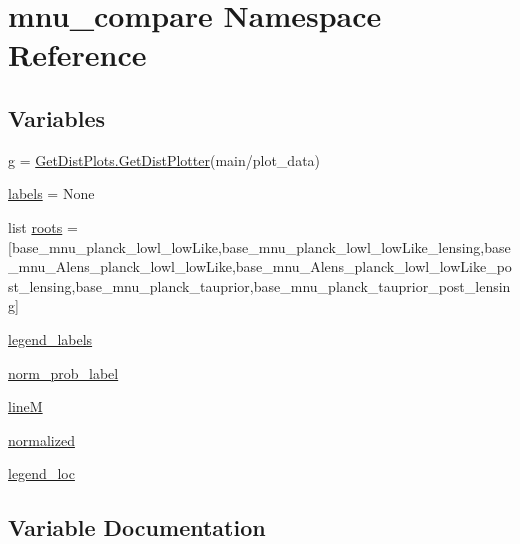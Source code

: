 \hypertarget{namespacemnu__compare}{}\section{mnu\+\_\+compare Namespace Reference}
\label{namespacemnu__compare}
\subsection*{Variables}
\begin{DoxyCompactItemize}
\item 
\mbox{\hyperlink{namespacemnu__compare_a0b3ebfeeadc47562ae3d9cd014ec1cd5}{g}} = \mbox{\hyperlink{classgetdist_1_1plots_1_1GetDistPlotter}{Get\+Dist\+Plots.\+Get\+Dist\+Plotter}}(\textquotesingle{}main/plot\+\_\+data\textquotesingle{})
\item 
\mbox{\hyperlink{namespacemnu__compare_aa5ff661bdf482297da0f229b27bb44cf}{labels}} = None
\item 
list \mbox{\hyperlink{namespacemnu__compare_a44369ac9173dc3327784e1ae5393d49a}{roots}} = \mbox{[}\textquotesingle{}base\+\_\+mnu\+\_\+planck\+\_\+lowl\+\_\+low\+Like\textquotesingle{},\textquotesingle{}base\+\_\+mnu\+\_\+planck\+\_\+lowl\+\_\+low\+Like\+\_\+lensing\textquotesingle{},\textquotesingle{}base\+\_\+mnu\+\_\+\+Alens\+\_\+planck\+\_\+lowl\+\_\+low\+Like\textquotesingle{},\textquotesingle{}base\+\_\+mnu\+\_\+\+Alens\+\_\+planck\+\_\+lowl\+\_\+low\+Like\+\_\+post\+\_\+lensing\textquotesingle{},\textquotesingle{}base\+\_\+mnu\+\_\+planck\+\_\+tauprior\textquotesingle{},\textquotesingle{}base\+\_\+mnu\+\_\+planck\+\_\+tauprior\+\_\+post\+\_\+lensing\textquotesingle{}\mbox{]}
\item 
\mbox{\hyperlink{namespacemnu__compare_ad1d0329e168c4e8abcbf4fd341a190b7}{legend\+\_\+labels}}
\item 
\mbox{\hyperlink{namespacemnu__compare_ad1f46a08ce79ca199af24a7fc0bb295c}{norm\+\_\+prob\+\_\+label}}
\item 
\mbox{\hyperlink{namespacemnu__compare_a2bf023467c284aef153f96861d4506cf}{lineM}}
\item 
\mbox{\hyperlink{namespacemnu__compare_afec775f2846842aa746d8050da518d8e}{normalized}}
\item 
\mbox{\hyperlink{namespacemnu__compare_acbb6b738cbe9ba84aee75544c3a95b0b}{legend\+\_\+loc}}
\end{DoxyCompactItemize}


\subsection{Variable Documentation}
\mbox{\label{namespacemnu__compare_a0b3ebfeeadc47562ae3d9cd014ec1cd5}} 
